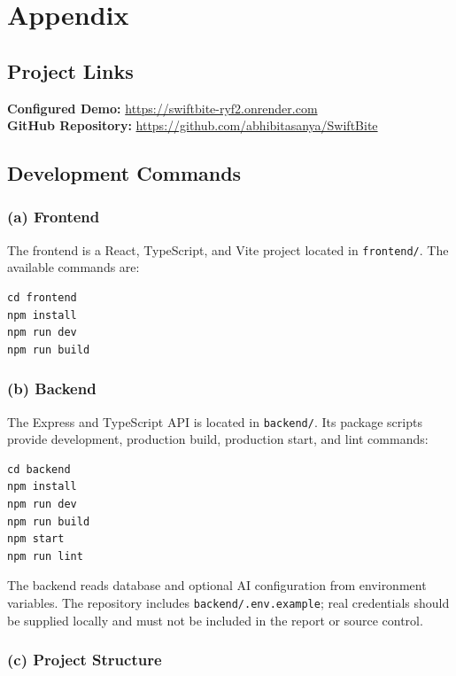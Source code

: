\chapter{Appendix}

\section*{Project Links}
\textbf{Configured Demo:} \url{https://swiftbite-ryf2.onrender.com} \\
\textbf{GitHub Repository:} \url{https://github.com/abhibitasanya/SwiftBite}

\section{Development Commands}

\subsection*{(a) Frontend}

The frontend is a React, TypeScript, and Vite project located in \texttt{frontend/}. The available commands are:

\begin{verbatim}
cd frontend
npm install
npm run dev
npm run build
\end{verbatim}

\subsection*{(b) Backend}

The Express and TypeScript API is located in \texttt{backend/}. Its package scripts provide development, production build, production start, and lint commands:

\begin{verbatim}
cd backend
npm install
npm run dev
npm run build
npm start
npm run lint
\end{verbatim}

The backend reads database and optional AI configuration from environment variables. The repository includes \texttt{backend/.env.example}; real credentials should be supplied locally and must not be included in the report or source control.

\subsection*{(c) Project Structure}

